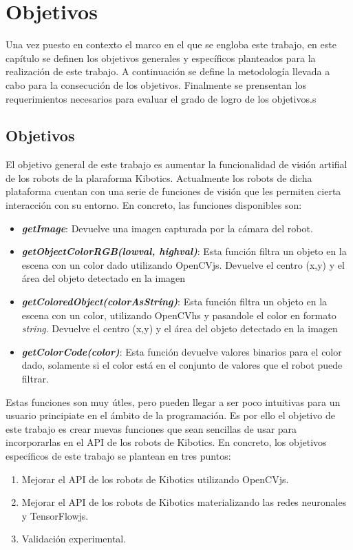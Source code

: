 \documentclass{report}
\begin{document}
\chapter{Objetivos}
Una vez puesto en contexto el marco en el que se engloba este trabajo, en este capítulo se definen los objetivos generales y específicos planteados para la realización de este trabajo. A continuación se define la metodología llevada a cabo para la consecución de los objetivos. Finalmente se prensentan los requerimientos necesarios para evaluar el grado de logro de los objetivos.s 

\section{Objetivos}
El objetivo general de este trabajo es aumentar la funcionalidad de visión artifial de los robots de la plaraforma Kibotics. Actualmente los robots de dicha plataforma cuentan con una serie de funciones de visión que les permiten cierta interacción con su entorno. En concreto, las funciones disponibles son:

\begin{itemize}
\item \textit{\textbf{getImage}}: Devuelve una imagen capturada por la cámara del robot.
\item \textit{\textbf{getObjectColorRGB(lowval, highval)}}: Esta función filtra un objeto en la escena con un color dado utilizando OpenCVjs. Devuelve el centro (x,y) y el área del objeto detectado en la imagen
\item \textit{\textbf{getColoredObject(colorAsString)}}: Esta función filtra un objeto en la escena con un color, utilizando OpenCVhs y pasandole el color en formato \textit{string}. Devuelve el centro (x,y) y el área del objeto detectado en la imagen
\item \textit{\textbf{getColorCode(color)}}: Esta función devuelve valores binarios para el color dado, solamente si el color está en el conjunto de valores que el robot puede filtrar.
\end{itemize}

Estas funciones son muy útles, pero pueden llegar a ser poco intuitivas para un usuario principiate en el ámbito de la programación. Es por ello el objetivo de este trabajo es crear nuevas funciones que sean sencillas de usar para incorporarlas en el API de los robots de Kibotics. En concreto, los objetivos específicos de este trabajo se plantean en tres puntos:

\newpage
\begin{enumerate}
\item Mejorar el API de los robots de Kibotics utilizando OpenCVjs.
\item Mejorar el API de los robots de Kibotics materializando las redes neuronales y TensorFlowjs.
\item Validación experimental.
\end{enumerate}
\end{document}

